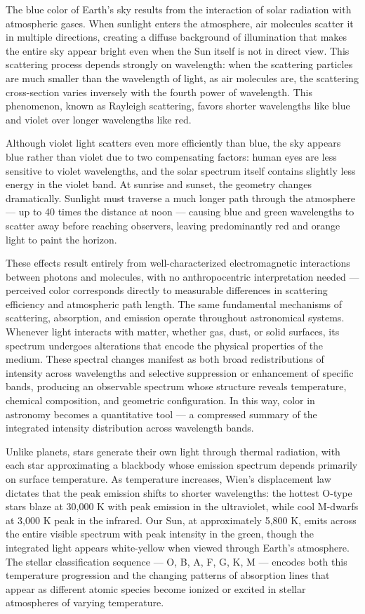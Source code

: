 The blue color of Earth's sky results from the interaction of solar radiation with atmospheric gases. When sunlight enters the atmosphere, air molecules scatter it in multiple directions, creating a diffuse background of illumination that makes the entire sky appear bright even when the Sun itself is not in direct view. This scattering process depends strongly on wavelength: when the scattering particles are much smaller than the wavelength of light, as air molecules are, the scattering cross-section varies inversely with the fourth power of wavelength. This phenomenon, known as Rayleigh scattering, favors shorter wavelengths like blue and violet over longer wavelengths like red.

Although violet light scatters even more efficiently than blue, the sky appears blue rather than violet due to two compensating factors: human eyes are less sensitive to violet wavelengths, and the solar spectrum itself contains slightly less energy in the violet band. At sunrise and sunset, the geometry changes dramatically. Sunlight must traverse a much longer path through the atmosphere — up to 40 times the distance at noon — causing blue and green wavelengths to scatter away before reaching observers, leaving predominantly red and orange light to paint the horizon.

These effects result entirely from well-characterized electromagnetic interactions between photons and molecules, with no anthropocentric interpretation needed — perceived color corresponds directly to measurable differences in scattering efficiency and atmospheric path length. The same fundamental mechanisms of scattering, absorption, and emission operate throughout astronomical systems. Whenever light interacts with matter, whether gas, dust, or solid surfaces, its spectrum undergoes alterations that encode the physical properties of the medium. These spectral changes manifest as both broad redistributions of intensity across wavelengths and selective suppression or enhancement of specific bands, producing an observable spectrum whose structure reveals temperature, chemical composition, and geometric configuration. In this way, color in astronomy becomes a quantitative tool — a compressed summary of the integrated intensity distribution across wavelength bands.

Unlike planets, stars generate their own light through thermal radiation, with each star approximating a blackbody whose emission spectrum depends primarily on surface temperature. As temperature increases, Wien's displacement law dictates that the peak emission shifts to shorter wavelengths: the hottest O-type stars blaze at 30,000 K with peak emission in the ultraviolet, while cool M-dwarfs at 3,000 K peak in the infrared. Our Sun, at approximately 5,800 K, emits across the entire visible spectrum with peak intensity in the green, though the integrated light appears white-yellow when viewed through Earth's atmosphere. The stellar classification sequence — O, B, A, F, G, K, M — encodes both this temperature progression and the changing patterns of absorption lines that appear as different atomic species become ionized or excited in stellar atmospheres of varying temperature.


